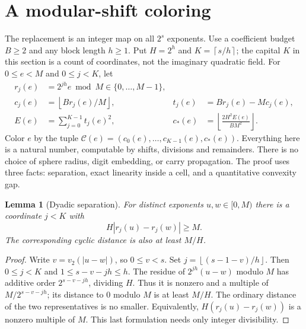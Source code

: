 \documentclass[11pt]{article}
\newtheorem{lemma}[theorem]{Lemma}
\theoremstyle{remark}\newtheorem{remark}[theorem]{Remark}
\newcommand{\floor}[1]{\left\lfloor #1\right\rfloor}
\newcommand{\ceil}[1]{\left\lceil #1\right\rceil}
\begin{document}
\section{A modular-shift coloring}\label{sec:color}
The replacement is an integer map on all $2^s$ exponents. Use a coefficient budget $B\ge2$ and any block length $h\ge1$. Put $H=2^h$ and $K=\ceil{s/h}$; the capital $K$ in this section is a count of coordinates, not the imaginary quadratic field. For $0\le e<M$ and $0\le j<K$, let
\begin{align}
 r_j(e)&=2^{jh}e\bmod M\in\{0,\ldots,M-1\},\\
 c_j(e)&=\floor{Br_j(e)/M}, & t_j(e)&=Br_j(e)-Mc_j(e),\\
 E(e)&=\sum_{j=0}^{K-1}t_j(e)^2,&
 c_*(e)&=\floor{\frac{2H^2 E(e)}{BM^2}}.\label{eq:energy}
\end{align}
Color $e$ by the tuple $\mathcal C(e)=(c_0(e),\ldots,c_{K-1}(e),c_*(e))$. Everything here is a natural number, computable by shifts, divisions and remainders. There is no choice of sphere radius, digit embedding, or carry propagation. The proof uses three facts: separation, exact linearity inside a cell, and a quantitative convexity gap.

\begin{lemma}[Dyadic separation]\label{lem:sep}
For distinct exponents $u,w\in[0,M)$ there is a coordinate $j<K$ with
\[
 H|r_j(u)-r_j(w)|\ge M.
\]
The corresponding cyclic distance is also at least $M/H$.
\end{lemma}
\begin{proof}
Write $v=v_2(|u-w|)$, so $0\le v<s$. Set $j=\floor{(s-1-v)/h}$. Then $0\le j<K$ and $1\le s-v-jh\le h$. The residue of $2^{jh}(u-w)$ modulo $M$ has additive order $2^{s-v-jh}$, dividing $H$. Thus it is nonzero and a multiple of $M/2^{s-v-jh}$; its distance to $0$ modulo $M$ is at least $M/H$. The ordinary distance of the two representatives is no smaller. Equivalently, $H(r_j(u)-r_j(w))$ is a nonzero multiple of $M$. This last formulation needs only integer divisibility.
\end{proof}
\end{document}
